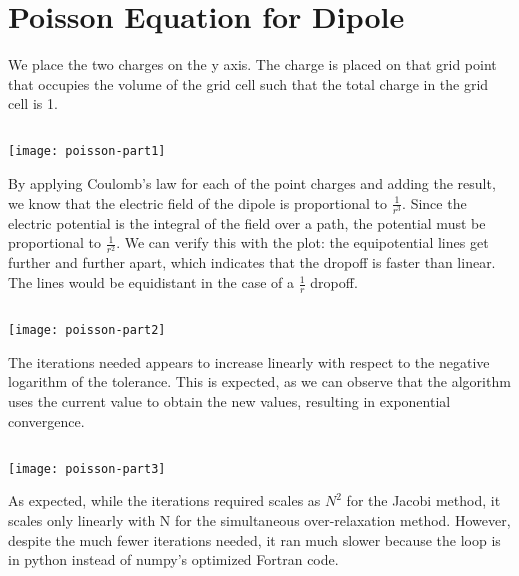 \documentclass[10pt]{article}
\begin{document}
\section{Poisson Equation for Dipole}
We place the two charges on the y axis. The charge is placed on that grid point that occupies the volume of the grid cell such that the total charge in the grid cell is 1.
\subsection{}
\texttt{[image: poisson-part1]}

By applying Coulomb's law for each of the point charges and adding the result, we know that the electric field of the dipole is proportional to $ \frac{1}{r^3} $. Since the electric potential is the integral of the field over a path, the potential must be proportional to $ \frac{1}{r^2} $. We can verify this with the plot: the equipotential lines get further and further apart, which indicates that the dropoff is faster than linear. The lines would be equidistant in the case of a \(\frac{1}{r}\) dropoff.

\subsection{}
\texttt{[image: poisson-part2]}

The iterations needed appears to increase linearly with respect to the negative logarithm of the tolerance. This is expected, as we can observe that the algorithm uses the current value to obtain the new values, resulting in exponential convergence.

\subsection{}
\texttt{[image: poisson-part3]}

As expected, while the iterations required scales as $N^2$ for the  Jacobi method, it scales only linearly with N for the simultaneous over-relaxation method. However, despite the much fewer iterations needed, it ran much slower because the loop is in python instead of numpy's optimized Fortran code.
\end{document}
